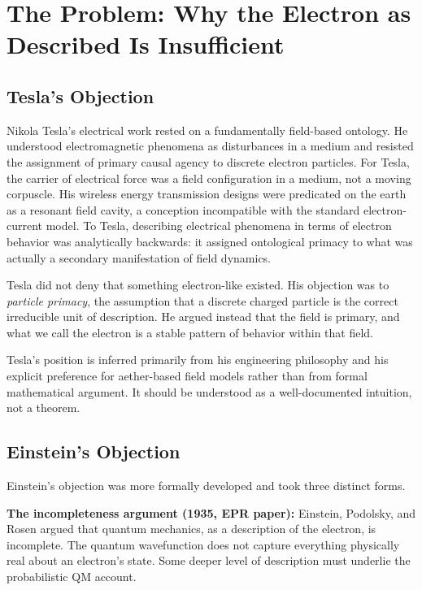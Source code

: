 \documentclass[12pt]{article}
\begin{document}
\section{The Problem: Why the Electron as Described Is Insufficient}\label{the-problem-why-the-electron-as-described-is-insufficient}

\subsection{Tesla's Objection}\label{teslas-objection}

Nikola Tesla's electrical work rested on a fundamentally field-based
ontology. He understood electromagnetic phenomena as disturbances in a
medium and resisted the assignment of primary causal agency to discrete
electron particles. For Tesla, the carrier of electrical force was a
field configuration in a medium, not a moving corpuscle. His wireless
energy transmission designs were predicated on the earth as a resonant
field cavity, a conception incompatible with the standard
electron-current model. To Tesla, describing electrical phenomena in
terms of electron behavior was analytically backwards: it assigned
ontological primacy to what was actually a secondary manifestation of
field dynamics.

Tesla did not deny that something electron-like existed. His objection
was to \emph{particle primacy}, the assumption that a discrete charged
particle is the correct irreducible unit of description. He argued
instead that the field is primary, and what we call the electron is a
stable pattern of behavior within that field.

Tesla's position is inferred primarily from his engineering philosophy
and his explicit preference for aether-based field models rather than
from formal mathematical argument. It should be understood as a
well-documented intuition, not a theorem.

\subsection{Einstein's Objection}\label{einsteins-objection}

Einstein's objection was more formally developed and took three distinct
forms.

\textbf{The incompleteness argument (1935, EPR paper):} Einstein,
Podolsky, and Rosen argued that quantum mechanics, as a description of
the electron, is incomplete. The quantum wavefunction does not capture
everything physically real about an electron's state. Some deeper level
of description must underlie the probabilistic QM account.
\end{document}
